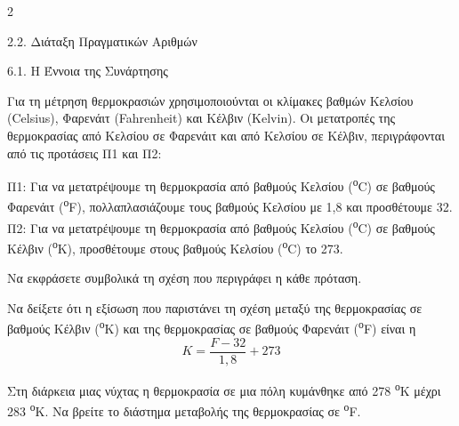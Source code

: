 \begin{ylh}{2}
    \item 2.2. Διάταξη Πραγματικών Αριθμών
    \item 6.1. Η Έννοια της Συνάρτησης
\end{ylh}
Για τη μέτρηση θερμοκρασιών χρησιμοποιούνται οι κλίμακες βαθμών Κελσίου (Celsius), Φαρενάιτ (Fahrenheit) και Κέλβιν (Kelvin). Οι μετατροπές της θερμοκρασίας από Κελσίου σε Φαρενάιτ και από Κελσίου σε Κέλβιν, περιγράφονται από τις προτάσεις Π1 και Π2:

Π1: Για να μετατρέψουμε τη θερμοκρασία από βαθμούς Κελσίου (\textsuperscript{ο}C) σε βαθμούς Φαρενάιτ (\textsuperscript{ο}F), πολλαπλασιάζουμε τους βαθμούς Κελσίου με 1,8 και προσθέτουμε 32.\\
Π2: Για να μετατρέψουμε τη θερμοκρασία από βαθμούς Κελσίου (\textsuperscript{ο}C) σε βαθμούς Κέλβιν (\textsuperscript{ο}K), προσθέτουμε στους βαθμούς Κελσίου (\textsuperscript{ο}C) το 273.

\begin{alist}
\item Να εκφράσετε συμβολικά τη σχέση που περιγράφει η κάθε πρόταση.
\item Να δείξετε ότι η εξίσωση που παριστάνει τη σχέση μεταξύ της θερμοκρασίας σε βαθμούς Κέλβιν (\textsuperscript{ο}K) και της θερμοκρασίας σε βαθμούς Φαρενάιτ (\textsuperscript{ο}F) είναι η
\[ {K} = \dfrac{{F} - 32}{1,8} + 273 \]
\item Στη διάρκεια μιας νύχτας η θερμοκρασία σε μια πόλη κυμάνθηκε από 278 \textsuperscript{ο}K μέχρι 283 \textsuperscript{ο}K. Να βρείτε το διάστημα μεταβολής της θερμοκρασίας σε \textsuperscript{ο}F.
\end{alist}

